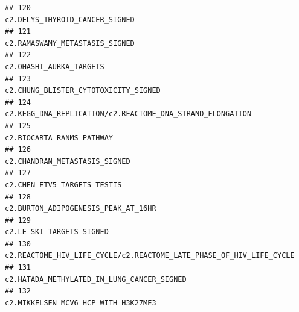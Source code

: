 \documentclass{article}\usepackage[]{graphicx}\usepackage[]{color}
\makeatletter
\newenvironment{kframe}{%
 \def\at@end@of@kframe{}%
 \ifinner\ifhmode%
  \def\at@end@of@kframe{\end{minipage}}%
  \begin{minipage}{\columnwidth}%
 \fi\fi%
 \def\FrameCommand##1{\hskip\@totalleftmargin \hskip-\fboxsep
 \colorbox{shadecolor}{##1}\hskip-\fboxsep
     \hskip-\linewidth \hskip-\@totalleftmargin \hskip\columnwidth}%
 \MakeFramed {\advance\hsize-\width
   \@totalleftmargin\z@ \linewidth\hsize
   \@setminipage}}%
 {\par\unskip\endMakeFramed%
 \at@end@of@kframe}
\newenvironment{knitrout}{}{} %
\makeatother
\begin{document}
\begin{knitrout}
\begin{kframe}
\begin{verbatim}
## 120                                                                                                                                                                                   c2.DELYS_THYROID_CANCER_SIGNED
## 121                                                                                                                                                                                   c2.RAMASWAMY_METASTASIS_SIGNED
## 122                                                                                                                                                                                          c2.OHASHI_AURKA_TARGETS
## 123                                                                                                                                                                             c2.CHUNG_BLISTER_CYTOTOXICITY_SIGNED
## 124                                                                                                                                                        c2.KEGG_DNA_REPLICATION/c2.REACTOME_DNA_STRAND_ELONGATION
## 125                                                                                                                                                                                        c2.BIOCARTA_RANMS_PATHWAY
## 126                                                                                                                                                                                    c2.CHANDRAN_METASTASIS_SIGNED
## 127                                                                                                                                                                                      c2.CHEN_ETV5_TARGETS_TESTIS
## 128                                                                                                                                                                              c2.BURTON_ADIPOGENESIS_PEAK_AT_16HR
## 129                                                                                                                                                                                         c2.LE_SKI_TARGETS_SIGNED
## 130                                                                                                                                              c2.REACTOME_HIV_LIFE_CYCLE/c2.REACTOME_LATE_PHASE_OF_HIV_LIFE_CYCLE
## 131                                                                                                                                                                       c2.HATADA_METHYLATED_IN_LUNG_CANCER_SIGNED
## 132                                                                                                                                                                              c2.MIKKELSEN_MCV6_HCP_WITH_H3K27ME3

\end{verbatim}
\end{kframe}
\end{knitrout}
\end{document}
